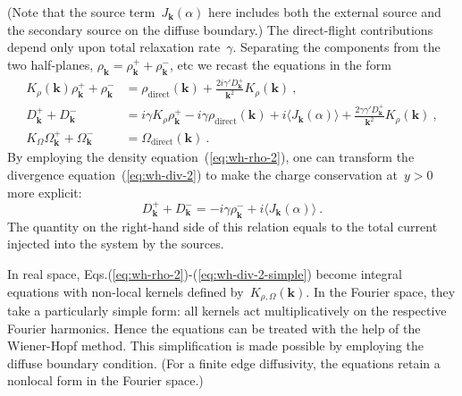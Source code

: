 \documentclass[preprint,aps,eqsecnum]{revtex4-1}
\newcommand{\fplus}[1]{{#1}^{+}}
\newcommand{\fminus}[1]{{#1}^{-}}
\newcommand{\dct}[1]{{#1}_\mathrm{direct}}
\begin{document}
(Note that the source term~$J_{\bm k}(\alpha)$ here includes
both the external source and the secondary source on the diffuse boundary.)
The direct-flight contributions depend only upon total relaxation rate~$\gamma$.
Separating the components from the two half-planes,
$\rho_{\bm k} = \fplus{\rho}_{\bm k} + \fminus{\rho}_{\bm k}$, etc we
recast the equations in the form
\begin{align}
  K_\rho({\bm k}) \fplus{\rho}_{\bm k} + \fminus{\rho}_{\bm k}
  &= \dct{\rho}({\bm k})
        + \frac{2 i \gamma' \fplus{D}_{\bm k}}{{\bm k}^2} K_\rho({\bm k})
  \ ,
  \label{eq:wh-rho-2}
 \\
  \fplus{D}_{\bm k} + \fminus{D}_{\bm k} &= i \gamma K_\rho \fplus{\rho}_{\bm k}
  -i \gamma \dct{\rho}({\bm k}) + i \langle J_{\bm k}(\alpha) \rangle
  + \frac{2\gamma\gamma' \fplus{D}_{\bm k}}{{\bm k}^2} K_\rho({\bm k})\ ,
  \label{eq:wh-div-2}
  \\
  K_\Omega\fplus{\Omega}_{\bm k} + \fminus{\Omega}_{\bm k}
  &= \dct{\Omega}({\bm k})
  \ .
  \label{eq:wh-omega-2}
\end{align}
By employing the density equation~(\ref{eq:wh-rho-2}), one can transform
the divergence equation~(\ref{eq:wh-div-2}) to make
the charge conservation at~$y > 0$ more explicit:
\begin{equation}
\label{eq:wh-div-2-simple}
\fplus{D}_{\bm k} + \fminus{D}_{\bm k} = -i \gamma \fminus{\rho}_{\bm k}
+ i \langle J_{\bm k}(\alpha) \rangle \ .
\end{equation}
The quantity on the right-hand side of this relation
equals to the total current
injected into the system by the sources.

In real space, Eqs.(\ref{eq:wh-rho-2})-(\ref{eq:wh-div-2-simple})
become integral equations with non-local kernels defined
by~$K_{\rho, \Omega}({\bm k})$. In the Fourier space, they take a particularly
simple form: all kernels act multiplicatively on the respective
Fourier harmonics. Hence the equations can be
treated with the help of the Wiener-Hopf method. This simplification is
made possible by employing the diffuse boundary condition. (For a finite
edge diffusivity, the equations retain a nonlocal form in the Fourier space.)
\end{document}

